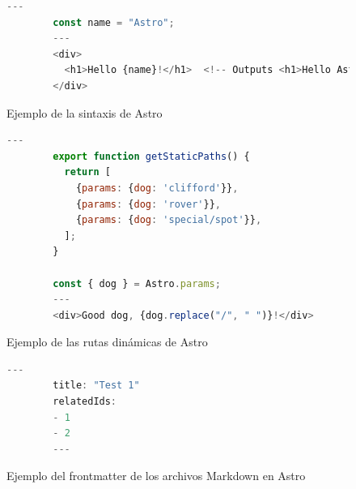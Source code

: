 \begin{figure}
    \begin{lstlisting}[language=Javascript]
        ---
        const name = "Astro";
        ---
        <div>
          <h1>Hello {name}!</h1>  <!-- Outputs <h1>Hello Astro!</h1> -->
        </div>
    \end{lstlisting}
    \caption{Ejemplo de la sintaxis de Astro}
    \label{fig:astroSyntax}
\end{figure}

\begin{figure}
    \begin{lstlisting}[language=Javascript]
        ---
        export function getStaticPaths() {
          return [
            {params: {dog: 'clifford'}},
            {params: {dog: 'rover'}},
            {params: {dog: 'special/spot'}},
          ];
        }
        
        const { dog } = Astro.params;
        ---
        <div>Good dog, {dog.replace("/", " ")}!</div>
    \end{lstlisting}
    \caption{Ejemplo de las rutas dinámicas de Astro}
    \label{fig:astroDynamicRoutes}
\end{figure}

\begin{figure}
    \begin{lstlisting}[language=Javascript]
        ---
        title: "Test 1"
        relatedIds:
        - 1
        - 2
        ---
    \end{lstlisting}
    \caption{Ejemplo del frontmatter de los archivos Markdown en Astro}
    \label{fig:astroFrontmatter}
\end{figure}

